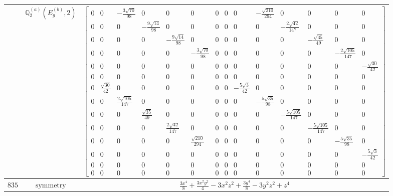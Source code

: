 \documentclass[fleqn,8pt,landscape]{jsarticle}
\begin{document}
\begin{longtable}{ccc}
$  $ & $ \mathbb{Q}_{2}^{(a)}(E_{g}^{(b)},2) $ & $ \begin{bmatrix} 0 & 0 & - \frac{3 \sqrt{70}}{98} & 0 & 0 & 0 & 0 & 0 & 0 & - \frac{\sqrt{210}}{294} & 0 & 0 & 0 & 0 \\ 0 & 0 & 0 & - \frac{9 \sqrt{14}}{98} & 0 & 0 & 0 & 0 & 0 & 0 & - \frac{2 \sqrt{42}}{147} & 0 & 0 & 0 \\ 0 & 0 & 0 & 0 & - \frac{9 \sqrt{14}}{98} & 0 & 0 & 0 & 0 & 0 & 0 & - \frac{\sqrt{35}}{49} & 0 & 0 \\ 0 & 0 & 0 & 0 & 0 & - \frac{3 \sqrt{70}}{98} & 0 & 0 & 0 & 0 & 0 & 0 & - \frac{2 \sqrt{105}}{147} & 0 \\ 0 & 0 & 0 & 0 & 0 & 0 & 0 & 0 & 0 & 0 & 0 & 0 & 0 & - \frac{\sqrt{30}}{42} \\ 0 & 0 & 0 & 0 & 0 & 0 & 0 & 0 & 0 & 0 & 0 & 0 & 0 & 0 \\ 0 & \frac{\sqrt{30}}{42} & 0 & 0 & 0 & 0 & 0 & 0 & - \frac{5 \sqrt{3}}{42} & 0 & 0 & 0 & 0 & 0 \\ 0 & 0 & \frac{2 \sqrt{105}}{147} & 0 & 0 & 0 & 0 & 0 & 0 & - \frac{5 \sqrt{35}}{98} & 0 & 0 & 0 & 0 \\ 0 & 0 & 0 & \frac{\sqrt{35}}{49} & 0 & 0 & 0 & 0 & 0 & 0 & - \frac{5 \sqrt{105}}{147} & 0 & 0 & 0 \\ 0 & 0 & 0 & 0 & \frac{2 \sqrt{42}}{147} & 0 & 0 & 0 & 0 & 0 & 0 & - \frac{5 \sqrt{105}}{147} & 0 & 0 \\ 0 & 0 & 0 & 0 & 0 & \frac{\sqrt{210}}{294} & 0 & 0 & 0 & 0 & 0 & 0 & - \frac{5 \sqrt{35}}{98} & 0 \\ 0 & 0 & 0 & 0 & 0 & 0 & 0 & 0 & 0 & 0 & 0 & 0 & 0 & - \frac{5 \sqrt{3}}{42} \\ 0 & 0 & 0 & 0 & 0 & 0 & 0 & 0 & 0 & 0 & 0 & 0 & 0 & 0 \\ 0 & 0 & 0 & 0 & 0 & 0 & 0 & 0 & 0 & 0 & 0 & 0 & 0 & 0 \end{bmatrix} $ \\ \hline
$ 835 $ & $ \text{symmetry} $ & $ \frac{3 x^{4}}{8} + \frac{3 x^{2} y^{2}}{4} - 3 x^{2} z^{2} + \frac{3 y^{4}}{8} - 3 y^{2} z^{2} + z^{4} $ \\

\end{longtable}
\end{document}
